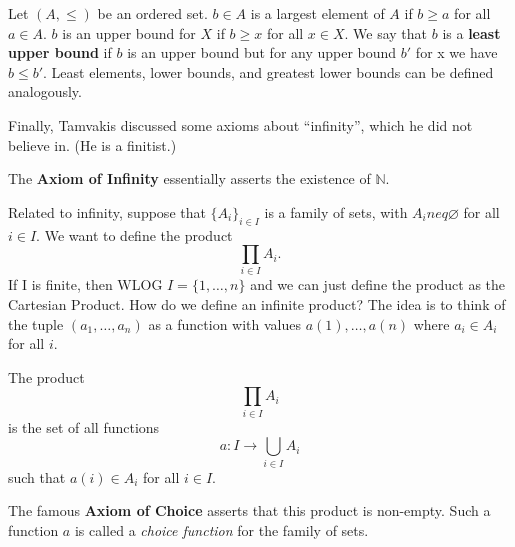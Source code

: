 \begin{definition}
	Let $(A, \leq)$ be an ordered set. $b \in A$ is a largest element of $A$ if $b \geq a$ for all $a \in A$. $b$ is an upper bound for $X$ if $b \geq x$ for all $x \in X$. We say that $b$ is a \textbf{least upper bound} if $b$ is an upper bound but for any upper bound $b'$ for x we have $b \leq b'$.
	Least elements, lower bounds, and greatest lower bounds can be defined analogously.
\end{definition}

Finally, Tamvakis discussed some axioms about ``infinity'', which he did not believe in. (He is a finitist.) 
\begin{definition}
	The \textbf{Axiom of Infinity} essentially asserts the existence of $\mathbb{N}$.
\end{definition}

Related to infinity, suppose that $\{A_i\}_{i \in I}$ is a family of sets, with $A_i neq \varnothing$ for all $i \in I$. We want to define the product 
\[\prod_{i \in I}A_i.\]
If I is finite, then WLOG $I = \{1, \dotsc, n\}$ and we can just define the product as the Cartesian Product. How do we define an infinite product? The idea is to think of the tuple $(a_1, \dots, a_n)$ as a function with values $a(1), \dotsc, a(n)$ where $a_i \in A_i$ for all $i$. 

\begin{definition}
	The product 
	\[\prod_{i \in I}A_i\] is the set of all functions \[a: I \to \bigcup_{i \in I}A_i\] such that $a(i) \in A_i$ for all $i \in I$. 
\end{definition}

The famous \textbf{Axiom of Choice} asserts that this product is non-empty. Such a function $a$ is called a \textit{choice function} for the family of sets.